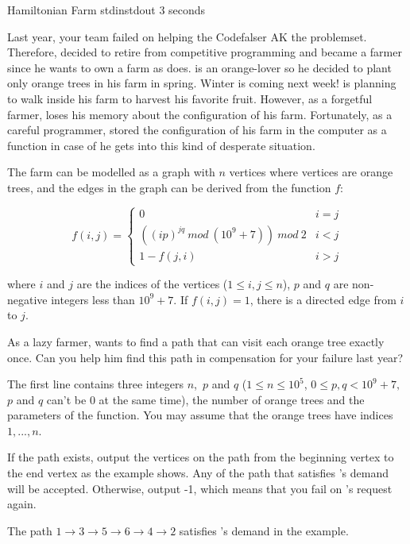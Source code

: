 \begin{problem}{Hamiltonian Farm}
{stdin}{stdout}
{3 seconds}{}{}

Last year, your team failed on helping the Codefalser \Suzukaze  AK the problemset. Therefore, \Suzukaze decided to retire from competitive programming and became a farmer since he wants to own a farm as \pittoresque does. \Suzukaze is an orange-lover so he decided to plant only orange trees in his farm in spring. Winter is coming next week! \Suzukaze is planning to walk inside his farm to harvest his favorite fruit. However, as a forgetful farmer, \Suzukaze loses his memory about the configuration of his farm. Fortunately, as a careful programmer, \Suzukaze stored the configuration of his farm in the computer as a function in case of he gets into this kind of desperate situation.
\par
The farm can be modelled as a graph with $n$ vertices where vertices are orange trees, and the edges in the graph can be derived from the function $f$:

$$f(i,j)=
\begin{cases}
0& \text{$i=j$}\\
((ip)^{jq}\ mod\ (10^{9}+7))\ mod\ 2& \text{$i<j$}\\
1-f(j,i)& \text{$i>j$}
\end{cases}$$

where $i$ and $j$ are the indices of the vertices ($1\leq i,j\leq n$), $p$ and $q$ are non-negative integers less than $10^{9}+7$. If $f(i,j)=1$, there is a directed edge from $i$ to $j$.

\par
As a lazy farmer, \Suzukaze wants to find a path that can visit each orange tree exactly once. Can you help him find this path in compensation for your failure last year?

\InputFile

The first line contains three integers $n$,\ $p$ and $q$ ($1 \leq n \leq 10^{5}$, $0 \leq p,q < 10^{9}+7,$ $p$ and $q$ can't be 0 at the same time), the number of orange trees and the parameters of the function. You may assume that the orange trees have indices $1, ..., n$.

\OutputFile

If the path exists, output the vertices on the path from the beginning vertex to the end vertex as the example shows. Any of the path that satisfies \Suzukaze 's demand will be accepted. Otherwise, output -1, which means that you fail on \Suzukaze 's request again.

\Examples

\begin{example}
%
\end{example}

\Explanation
The path $1\xrightarrow{}3\xrightarrow{}5\xrightarrow{}6\xrightarrow{}4\xrightarrow{}2$ satisfies \Suzukaze's demand in the example.

\end{problem}
